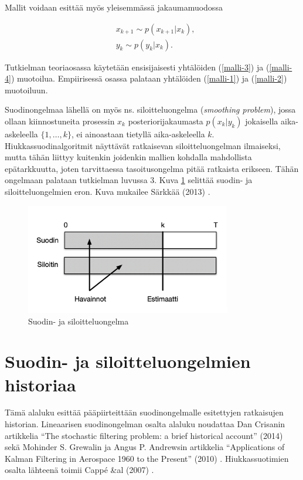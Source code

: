 \documentclass[
  12pt,
  a4paper, twoside]{book}
\begin{document}
Mallit voidaan esittää myös yleisemmässä jakaumamuodossa

\begin{align}
&\label{malli-3} x_{k+1} \sim p(x_{k+1}|x_k),\\
&\label{malli-4} y_{k} \sim p(y_k|x_k).
\end{align}

\noindent Tutkielman teoriaosassa käytetään ensisijaisesti yhtälöiden (\ref{malli-3}) ja (\ref{malli-4}) muotoilua. Empiirisessä osassa palataan yhtälöiden (\ref{malli-1}) ja (\ref{malli-2}) muotoiluun.

Suodinongelmaa lähellä on myös ns. siloitteluongelma (\emph{smoothing problem}), jossa ollaan kiinnostuneita prosessin \(x_k\) posteriorijakaumasta \(p(x_k|y_k)\) jokaisella aika-askeleella \(\{1,\ldots,k\}\), ei ainoastaan tietyllä aika-askeleella \(k\). Hiukkassuodinalgoritmit näyttävät ratkaisevan siloitteluongelman ilmaiseksi, mutta tähän liittyy kuitenkin joidenkin mallien kohdalla mahdollista epätarkkuutta, joten tarvittaessa tasoitusongelma pitää ratkaista erikseen. Tähän ongelmaan palataan tutkielman luvussa 3. Kuva \ref{fig:suodin_vs_siloitin} selittää suodin- ja siloitteluongelmien eron. Kuva mukailee Särkkää (2013) \citep{sarkka-2013}.

\begin{figure}[H]
\centering
\includegraphics[width=9cm]{suodin_vs_siloitin_cropped}
\caption{Suodin- ja siloitteluongelma}
\label{fig:suodin_vs_siloitin}
\end{figure}

\section{Suodin- ja siloitteluongelmien historiaa}

Tämä alaluku esittää pääpiirteittään suodinongelmalle esitettyjen ratkaisujen historian. Lineaarisen suodinongelman osalta alaluku noudattaa Dan Crisanin artikkelia ``The stochastic filtering problem: a brief historical account'' (2014) \citep{crisan-2014} sekä Mohinder S. Grewalin ja Angus P. Andrewsin artikkelia ``Applications of Kalman Filtering in Aerospace 1960 to the Present'' (2010) \citep{Grewal-2010}. Hiukkassuotimien osalta lähteenä toimii Cappé \&al (2007) \citep{cappe-2007}.
\end{document}
